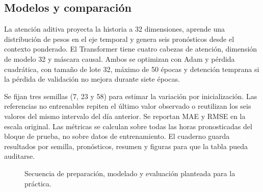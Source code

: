 \documentclass[12pt]{article}
\begin{document}
\subsection{Modelos y comparación}
La atención aditiva proyecta la historia a 32 dimensiones, aprende una distribución de pesos en el eje temporal y genera seis pronósticos desde el contexto ponderado. El Transformer tiene cuatro cabezas de atención, dimensión de modelo 32 y máscara causal. Ambos se optimizan con Adam y pérdida cuadrática, con tamaño de lote 32, máximo de 50 épocas y detención temprana si la pérdida de validación no mejora durante siete épocas.

Se fijan tres semillas (7, 23 y 58) para estimar la variación por inicialización. Las referencias no entrenables repiten el último valor observado o reutilizan los seis valores del mismo intervalo del día anterior. Se reportan MAE y RMSE en la escala original. Las métricas se calculan sobre todas las horas pronosticadas del bloque de prueba, no sobre datos de entrenamiento. El cuaderno guarda resultados por semilla, pronósticos, resumen y figuras para que la tabla pueda auditarse.

\begin{figure}[H]
\centering
{}
\caption{Secuencia de preparación, modelado y evaluación planteada para la práctica.}
\end{figure}
\end{document}
